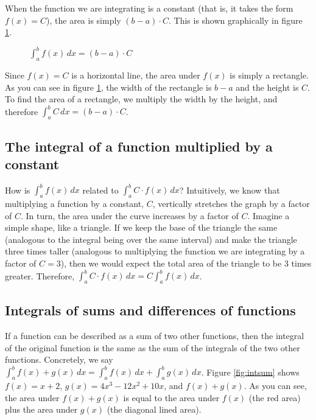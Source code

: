When the function we are integrating is a constant (that is, it takes 
the form $f(x) = C$), the area is simply $(b - a) \cdot C$. This is 
shown graphically in figure \ref{fig:constant}. 

\begin{figure}[H]
	\centering
    \caption{$\int_a^b f(x)\,dx = (b - a)\cdot C$}
    \label{fig:constant}
\end{figure}

Since $f(x) = C$ is a horizontal line, the area under $f(x)$ is simply 
a rectangle. As you can see in figure \ref{fig:constant}, the width of 
the rectangle is $b - a$ and the height is $C$. To find the area of a 
rectangle, we multiply the width by the height, and therefore $\int_a^b 
C\,dx = (b - a)\cdot C$.

\subsection{The integral of a function multiplied by a constant}
How is $\int_a^b f(x)\,dx$ related to $\int_a^b C \cdot f(x)\,dx$? 
Intuitively, we know that multiplying a function by a constant, $C$, 
vertically stretches the graph by a factor of $C$. In turn, the area 
under the curve increases by a factor of $C$. Imagine a simple shape, 
like a triangle. If we keep the base of the triangle the same 
(analogous to the integral being over the same interval) and make the 
triangle three times taller (analogous to multiplying the function 
we are integrating by a factor of $C = 3$), then we would expect the 
total area of the triangle to be 3 times greater. Therefore, 
$\int_a^b C \cdot f(x)\,dx = C \int_a^b f(x)\,dx$. 

\subsection{Integrals of sums and differences of functions}
If a function can be described as a sum of two other functions, then 
the integral of the original function is the same as the sum of the 
integrals of the two other functions. Concretely, we say $\int_a^b 
f(x) + g(x)\,dx = \int_a^b f(x)\,dx + \int_a^b g(x)\,dx$. Figure 
\ref{fig:intsum} shows $f(x) = x + 2$, $g(x) = 4x^3-12x^2+10x$, and 
$f(x) + g(x)$. As you can see, the area under $f(x) + g(x)$ is equal 
to the area under $f(x)$ (the red area) plus the area under $g(x)$ 
(the diagonal lined area). 

